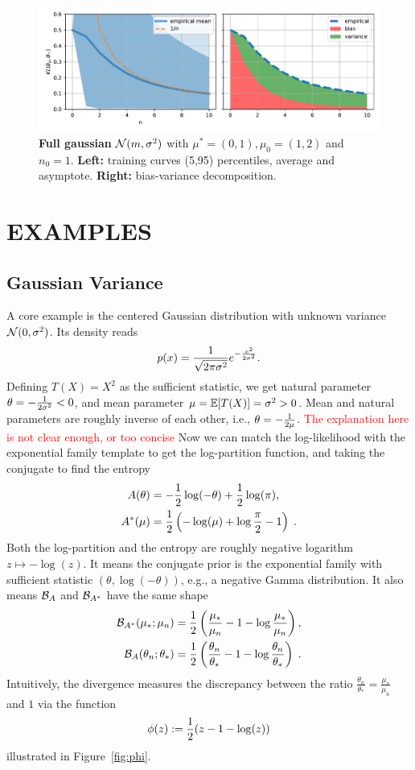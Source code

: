 \documentclass[twoside]{article}
\let\oldsection\section
\renewcommand{\section}[1]{\oldsection{\texorpdfstring{\uppercase{#1}}{#1}}}
\newcommand{\logpart}{A}
\newcommand{\conj}{\logpart^*}
\newcommand{\bregman}{\cB_\logpart}
\newcommand{\bregmanconj}{\cB_{\logpart^*}}
\newcommand{\nat}{\theta}
\newcommand{\m}{\mu}
\newcommand{\meanp}{\m}
\begin{document}
\begin{figure}[t]
	\centering
	\includegraphics[width=.4\textwidth]{figs/gaussians/new_linear_n0=1.pdf}
	\caption{
	\textbf{Full gaussian} ${\mathcal N}(m, \sigma^2)$ with $\meanp^*=(0, 1), \meanp_0 = (1,2)$ and $n_0=1$. \textbf{Left:} training curves (5,95) percentiles, average and asymptote.
	\textbf{Right:} bias-variance decomposition.
	}
	\label{fig:gaussian_decomposition}
\end{figure}


\section{Examples}
\label{sec:example}


\subsection{Gaussian Variance}
A core example is the centered Gaussian distribution with unknown variance ${\mathcal N}(0,\sigma^2)$.
Its density reads 
\[
	p(x) = \frac{1}{\sqrt{2\pi \sigma^2}} e^{-\frac{x^2}{2 \sigma^2}}.
\]
Defining $T(X)=X^2$ as the sufficient statistic, we get natural parameter $\nat = -\inv{2 \sigma^2} <0$, and mean parameter $\m=\E[T(X)] = \sigma^2 >0$.
Mean and natural parameters are roughly inverse of each other, i.e., $\nat = -\inv{2 \m}$.
\textcolor{red}{The explanation here is not clear enough, or too concise} Now we can match the log-likelihood with the exponential family template to get the log-partition function, and taking the conjugate to find the entropy
\begin{align}
	\logpart (\nat) &= - \half \log(-\nat)  + \half \log(\pi), \\
	\conj(\m) &= \half\left( -\log(\m) + \log\frac{\pi}{2} - 1 \right) \; .
\end{align}
Both the log-partition and  the entropy are roughly negative logarithm $z\mapsto - \log(z)$.
It means the conjugate prior is the exponential family with sufficient statistic $(\nat, \log(-\nat) )$, e.g., a negative Gamma distribution.
It also means $\bregman$ and $\bregmanconj$ have the same shape
\begin{align}
	\bregmanconj( \m_*; \m_n)
	&= \half \left ( \frac{\m_*}{ \m_n} - 1 - \log  \frac{\m_*}{ \m_n} \right), \\
	\bregman( \nat_n; \nat_* )
	&=  \half \left ( \frac{ \nat_n}{\nat_*} - 1 - \log  \frac{ \nat_n}{\nat_*} \right) \; .
\end{align}
Intuitively, the divergence measures the discrepancy between the ratio $\frac{ \nat_n}{\nat_*} =  \frac{\m_*}{ \m_n}  $ and $1$ via the function
\begin{align}
	\phi(z) := \frac{1}{2} (z - 1 - \log(z))
\end{align}
illustrated in Figure~\ref{fig:phi}. 
\end{document}
